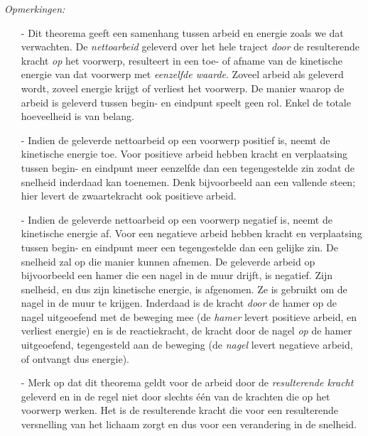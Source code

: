 \textit{Opmerkingen:}
\begin{enumerate}
\item[-]Dit theorema geeft een samenhang tussen arbeid en energie
zoals we dat verwachten. De \textit{nettoarbeid} geleverd over het hele traject \textit{door} de resulterende kracht \textit{op} het voorwerp, resulteert in een toe- of afname van de
kinetische energie van dat voorwerp met \textit{eenzelfde waarde}.
Zoveel arbeid als geleverd wordt, zoveel energie krijgt of verliest het voorwerp. De manier waarop de arbeid is geleverd tussen begin- en eindpunt speelt geen rol. Enkel de totale hoeveelheid is van belang.

\item[-]Indien de geleverde nettoarbeid op een voorwerp positief is, neemt de
kinetische energie toe. Voor positieve arbeid hebben kracht en
verplaatsing tussen begin- en eindpunt meer eenzelfde dan een
tegengestelde zin zodat de snelheid inderdaad kan toenemen. Denk bijvoorbeeld aan een vallende steen; hier levert de zwaartekracht ook positieve arbeid.
\item[-]Indien de geleverde nettoarbeid op een
voorwerp negatief is, neemt de kinetische energie af. Voor een
negatieve arbeid hebben kracht en verplaatsing tussen begin- en
eindpunt meer een tegengestelde dan een gelijke zin. De snelheid zal op die manier kunnen afnemen. De geleverde arbeid op
bij\-voor\-beeld een hamer die een nagel in de muur drijft, is
negatief. Zijn snelheid, en dus zijn kinetische energie, is
afgenomen. Ze is gebruikt om de nagel in de muur te krijgen.
Inderdaad is de kracht \textit{door} de hamer op de nagel
uitgeoefend met de beweging mee (de \textit{hamer} levert positieve arbeid, en verliest energie) en is de reactiekracht, de kracht door de nagel \textit{op} de hamer uitgeoefend, tegengesteld
aan de beweging (de \textit{nagel} levert negatieve arbeid, of ontvangt dus energie).
\item[-]Merk op dat dit theorema geldt voor de arbeid door de
\textit{resulterende kracht} geleverd en in de regel niet door
slechts \'e\'en van de krachten die op het voorwerp werken. Het is
de resulterende kracht die voor een resulterende versnelling van het
lichaam zorgt en dus voor een verandering in de snelheid.
\end{enumerate}

